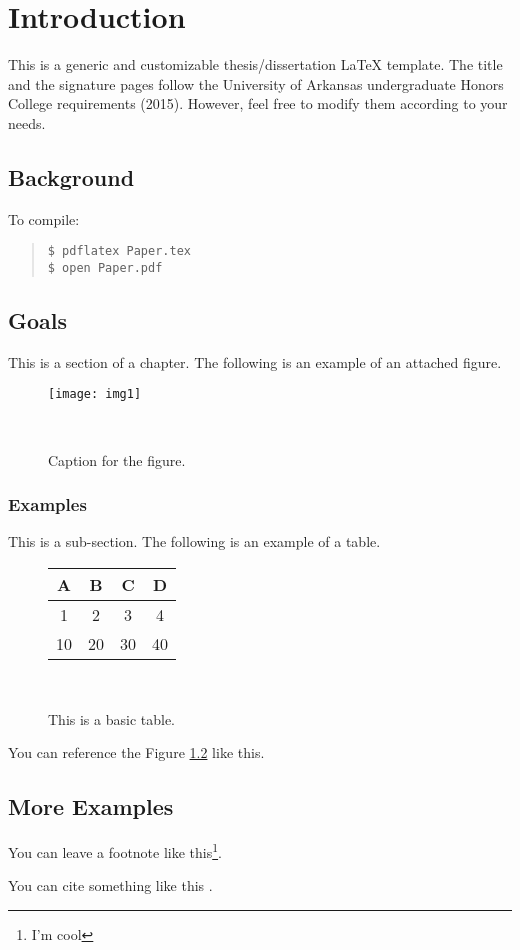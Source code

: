 \chapter{Introduction}

  This is a generic and customizable thesis/dissertation \LaTeX{} template. The title and the signature pages follow the University of Arkansas undergraduate Honors College requirements (2015). However, feel free to modify them according to your needs.

\section{Background}

To compile:

\begin{quote}
  \begin{Verbatim}
$ pdflatex Paper.tex
$ open Paper.pdf
  \end{Verbatim}
\end{quote}  

\section{Goals}

This is a section of a chapter. The following is an example of an attached figure.

\begin{figure}[H]
\centering
    \texttt{[image: img1]}
    \caption{Caption for the figure.}~\label{fig:mona_lisa}
\end{figure}


\subsection{Examples}

This is a sub-section. The following is an example of a table.

\begin{figure}[H]
\centering
\singlespacing
\begin{tabular}{c c c c}
  A & B & C & D \\
  \hline
  1 & 2 & 3 & 4 \\  
  10 & 20 & 30 & 40 \\
\end{tabular}
\caption{This is a basic table.}~\label{fig:tab_1}
\end{figure}

You can reference the Figure \ref{fig:tab_1} like this.

\section{More Examples}

You can leave a footnote like this\footnote{I'm cool}.

\noindent 
You can cite something like this \cite{einstein}.

